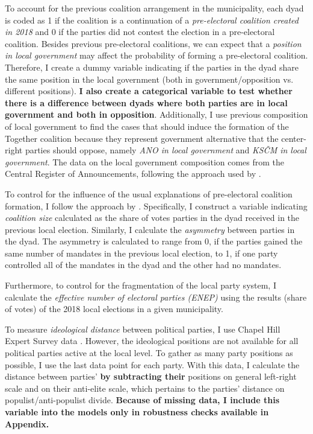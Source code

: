 \documentclass[]{interact}
\theoremstyle{plain}%
\theoremstyle{definition}
\theoremstyle{remark}
\begin{document}
To account for the previous coalition arrangement in the municipality, each dyad is coded as 1 if the coalition is a continuation of a \emph{pre-electoral coalition created in 2018} and 0 if the parties did not contest the election in a pre-electoral coalition. 
Besides previous pre-electoral coalitions, we can expect that a \emph{position in local government} may affect the probability of forming a pre-electoral coalition. Therefore, I create a dummy variable indicating if the parties in the dyad share the same position in the local government (both in government/opposition vs. different positions). \textbf{I also create a categorical variable to test whether there is a difference between dyads where both parties are in local government and both in opposition}. Additionally, I use previous composition of local government to find the cases that should induce the formation of the Together coalition because they represent government alternative that the center-right parties should oppose, namely \emph{ANO in local government} and \emph{KSČM in local government}. The data on the local government composition comes from the Central Register of Announcements, following the approach used by \citet{skvrnak2021}.

To control for the influence of the usual explanations of pre-electoral coalition formation, I follow the approach by \citet{golder2006}. Specifically, I construct a variable indicating \emph{coalition size} calculated as the share of votes parties in the dyad received in the previous local election. 
Similarly, I calculate the \emph{asymmetry} between parties in the dyad. The asymmetry is calculated to range from 0, if the parties gained the same number of mandates in the previous local election, to 1, if one party controlled all of the mandates in the dyad and the other had no mandates.

Furthermore, to control for the fragmentation of the local party system, I calculate the \emph{effective number of electoral parties (ENEP)} using the results (share of votes) of the 2018 local elections in a given municipality. %

To measure \emph{ideological distance} between political parties, I use Chapel Hill Expert Survey data \citep{jolly2022}. However, the ideological positions are not available for all political parties active at the local level. To gather as many party positions as possible, I use the last data point for each party. With this data, I calculate the distance between parties' \textbf{by subtracting their} positions on general left-right scale and on their anti-elite scale, which pertains to the parties' distance on populist/anti-populist divide. \textbf{Because of missing data, I include this variable into the models only in robustness checks available in Appendix.}
\end{document}
